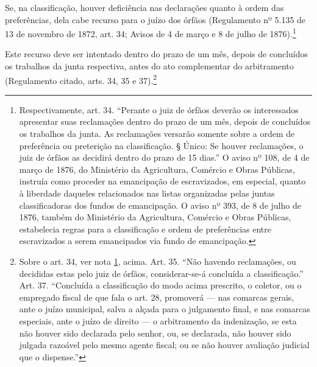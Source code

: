Se, na classificação, houver deficiência nas declarações quanto à ordem
das preferências, dela cabe recurso para o juízo dos órfãos (Regulamento
nº 5.135 de 13 de novembro de 1872, art. 34; Avisos de 4 de março e 8 de
julho de 1876).\footnote{Respectivamente, art. 34. ``Perante o juiz de \label{art34}
  órfãos deverão os interessados apresentar suas reclamações dentro do
  prazo de um mês, depois de concluídos os trabalhos da junta. As
  reclamações versarão somente sobre a ordem de preferência ou
  preterição na classificação. § Único: Se houver reclamações, o juiz de
  órfãos as decidirá dentro do prazo de 15 dias.'' O aviso nº 108, de
  4 de março de 1876, do Ministério da Agricultura, Comércio e Obras Públicas,
  instruía como proceder na emancipação de escravizados, em especial,
  quanto à liberdade daqueles relacionados nas listas organizadas pelas
  juntas classificadoras dos fundos de emancipação. O aviso nº 393, de
  8 de julho de 1876, também do Ministério da Agricultura, Comércio e Obras
  Públicas, estabelecia regras para a classificação e ordem de
  preferências entre escravizados a serem emancipados via fundo de
  emancipação.}

Este recurso deve ser intentado dentro do prazo de um mês, depois de
concluídos os trabalhos da junta respectiva, antes do ato complementar
do arbitramento (Regulamento citado, arts. 34, 35 e 37).\footnote{
  Sobre o art. 34, ver nota \ref{art34}, acima. Art. 35. ``Não havendo reclamações, ou
  decididas estas pelo juiz de órfãos, considerar-se-á concluída a
  classificação.'' Art. 37. ``Concluída a classificação do modo acima
  prescrito, o coletor, ou o empregado fiscal de que fala o art. 28,
  promoverá --- nas comarcas gerais, ante o juízo municipal, salva a
  alçada para o julgamento final, e nas comarcas especiais, ante o juízo
  de direito --- o arbitramento da indenização, se esta não houver sido
  declarada pelo senhor, ou, se declarada, não houver sido julgada
  razoável pelo mesmo agente fiscal; ou se não houver avaliação judicial
  que o dispense.''}


